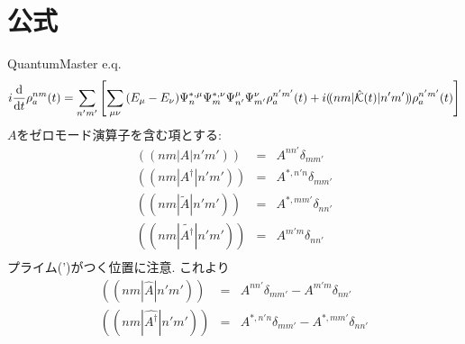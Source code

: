 \documentclass[10.5pt,a4paper]{jreport}
\newcommand{\dpbra}[1]{( \! ( #1 |}
\newcommand{\dpket}[1]{| #1 ) \! )}
\newcommand{\calK}{{\cal K}}
\begin{document}
\section{公式}
QuantumMaster e.q.
\begin{eqnarray}
  i\dv{t}\rho_a^{nm}(t) = \sum_{n'm'}\bqty{\sum_{\mu\nu}\pqty{E_\mu - E_\nu}\Psi_{n}^{*, \mu}\Psi_{m}^{*, \nu}\Psi_{n'}^{\mu}\Psi_{m'}^{\nu}\rho_a^{n'm'}(t) + i\dpbra{nm}\hat{\calK}(t)\dpket{n'm'}\rho_a^{n'm'}(t)}
\end{eqnarray}
$A$をゼロモード演算子を含む項とする:
\begin{eqnarray}
  \dpbra{nm}A\dpket{n'm'} &=& A^{nn'}\delta_{mm'}\\
  \dpbra{nm}A^\dagger\dpket{n'm'} &=& A^{*, n'n}\delta_{mm'}\\
  \dpbra{nm}\tilde{A}\dpket{n'm'} &=& A^{*, mm'}\delta_{nn'}\\
  \dpbra{nm}\tilde{A^\dagger}\dpket{n'm'} &=& A^{m'm}\delta_{nn'}\\
\end{eqnarray}
プライム(')がつく位置に注意. これより
\begin{eqnarray}
  \dpbra{nm}\hat{A}\dpket{n'm'} &=& A^{nn'}\delta_{mm'} - A^{m'm}\delta_{nn'}\\
  \dpbra{nm}\hat{A^\dagger}\dpket{n'm'} &=& A^{*, n'n}\delta_{mm'} - A^{*, mm'}\delta_{nn'}
\end{eqnarray}
\end{document}
